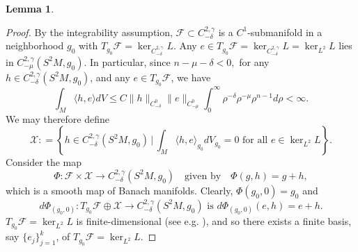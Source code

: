 \documentclass[12pt]{amsart}
\renewcommand{\1}{{\mathbf 1}}
\newtheorem{lemma}[thm]{Lemma}
\theoremstyle{others}
\numberwithin{equation}{section}
\begin{document}
\begin{lemma}
\end{lemma}
\begin{proof}
    By the integrability assumption, $\mathcal F \subset C^{2, \gamma}_{-\delta}$ is a $C^1$-submanifold in a neighborhood $g_0$ with $T_{g_0} \mathcal F = \ker_{C^{2, \gamma}_{-\delta}} L$.
    Any $e \in T_{g_0} \mathcal F = \ker_{C^{2, \gamma}_{-\delta}} L =  \ker_{L^2}L$ lies in $C^{2, \gamma}_{-\mu}(S^2M, g_0).$ %
    In particular, since $n - \mu - \delta < 0,$ for any $h \in C^{2, \gamma}_{-\delta}(S^2M, g_0)$, and any $e \in T_{g_0} \mathcal F$, we have
    \begin{equation} \label{orthogonal elliptic est proof, eqn 1}
        \int_M \langle h, e \rangle d V
        \le C \| h \|_{C^{0}_{-\delta}} \| e \|_{C^0_{-\mu}} \int_0^\infty \rho^{-\delta} \rho^{-\mu} \rho^{n-1} d \rho < \infty.
    \end{equation}
    We may therefore define
        $$\mathcal X : = \left\{ h \in C^{2, \gamma}_{-\delta} ( S^2M, g_0) \, | \, \int_M \langle h, e \rangle_{g_0} d V_{g_0} = 0 \text{ for all } e \in \ker_{L^2} L \right\} .$$
    Consider the map
        $$\Phi : \mathcal F \times \mathcal X \to C^{2, \gamma}_{-\delta}(S^2M , g_0)  \quad\text{given by} \quad  \Phi (g, h ) = g + h,$$
    which is a smooth map of Banach manifolds.
    Clearly, $\Phi(g_0, 0) = g_0$ and 
        $$d \Phi_{(g_0, 0)} : T_{g_0} \mathcal F \oplus \mathcal X \to C^{2, \gamma}_{-\delta}(S^2 M, g_0) \text{ is } d \Phi_{(g_0, 0)} ( e, h ) = e + h.$$
    $T_{g_0} \mathcal F = \ker_{L^2} L$ is finite-dimensional (see e.g. \cite[Theorem 2.11]{DeruelleKroncke20}), and so there exists a finite basis, say $\{ e_j \}_{j =1}^k$, of $T_{g_0} \mathcal F = \ker_{L^2} L$.

\end{proof}
\end{document}
